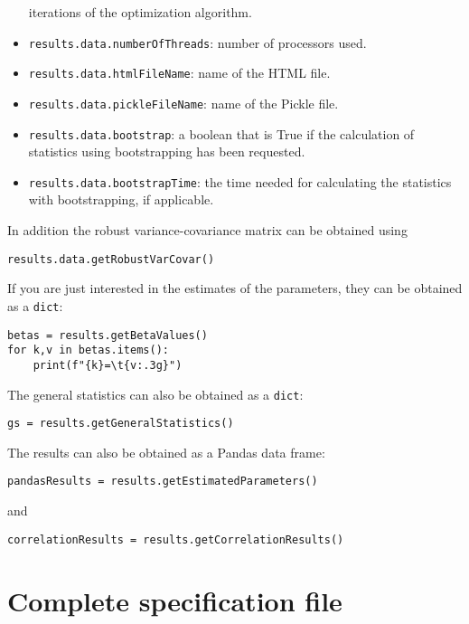 \documentclass[12pt,a4paper]{article}
\begin{document}
\begin{itemize}
  iterations of the optimization algorithm.
\item \lstinline+results.data.numberOfThreads+: number of processors
  used. 
\item \lstinline+results.data.htmlFileName+: name of the HTML file. 
\item \lstinline+results.data.pickleFileName+: name of the Pickle
  file. 
\item \lstinline+results.data.bootstrap+: a boolean that is True if
  the calculation of statistics using bootstrapping has been
  requested. 
\item \lstinline+results.data.bootstrapTime+: the time needed for
  calculating the statistics with bootstrapping, if applicable. 
\end{itemize}
In addition the robust variance-covariance matrix can be obtained
using
\begin{lstlisting}[style=nonumbers]
results.data.getRobustVarCovar()
\end{lstlisting}

If you are just interested in the estimates of the parameters, they
can be obtained as a \verb+dict+:
\begin{lstlisting}[style=nonumbers]
betas = results.getBetaValues()
for k,v in betas.items():
    print(f"{k}=\t{v:.3g}")
\end{lstlisting}

The general statistics can also be obtained as a \verb+dict+:
\begin{lstlisting}[style=nonumbers]
gs = results.getGeneralStatistics()
\end{lstlisting}


The results can also be obtained as a Pandas data frame:
\begin{lstlisting}[style=nonumbers]
pandasResults = results.getEstimatedParameters()
\end{lstlisting}
and
\begin{lstlisting}[style=nonumbers]
correlationResults = results.getCorrelationResults()
\end{lstlisting}






\clearpage 


\appendix

\section{Complete specification file}
\end{document}
